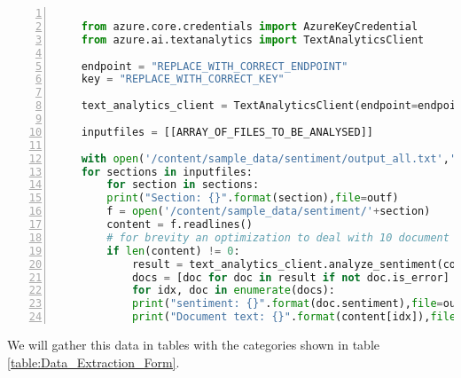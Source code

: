 \noindent\begin{minipage}[h]{\textwidth}
    \begin{lstlisting}[language=Python, numbers=left, caption=Text Analytics code, captionpos=b, label=listing:text_analytics, breaklines=true]

    from azure.core.credentials import AzureKeyCredential
    from azure.ai.textanalytics import TextAnalyticsClient
    
    endpoint = "REPLACE_WITH_CORRECT_ENDPOINT"
    key = "REPLACE_WITH_CORRECT_KEY"
    
    text_analytics_client = TextAnalyticsClient(endpoint=endpoint, credential=AzureKeyCredential(key))
    
    inputfiles = [[ARRAY_OF_FILES_TO_BE_ANALYSED]]
    
    with open('/content/sample_data/sentiment/output_all.txt','a') as outf:
    for sections in inputfiles:
        for section in sections:
        print("Section: {}".format(section),file=outf)
        f = open('/content/sample_data/sentiment/'+section)
        content = f.readlines()
        # for brevity an optimization to deal with 10 document limit is removed
        if len(content) != 0:
            result = text_analytics_client.analyze_sentiment(content, show_opinion_mining=True)
            docs = [doc for doc in result if not doc.is_error]
            for idx, doc in enumerate(docs):
            print("sentiment: {}".format(doc.sentiment),file=outf)
            print("Document text: {}".format(content[idx]),file=outf)
    \end{lstlisting}
\end{minipage}

We will gather this data in tables with the categories shown in table \ref{table:Data_Extraction_Form}.

